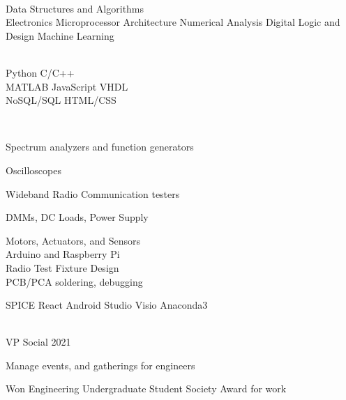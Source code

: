 \documentclass[]{rj-res}
\begin{document}
\begin{minipage}

\begin{multicols}{3}
\begin{multirows}

\location{}
 \\
\location{}
Data Structures and Algorithms \\
Electronics \newline
Microprocessor Architecture \newline
Numerical Analysis \newline
Digital Logic and Design \newline
Machine Learning 
\sectionsep

\\
\textbullet{}
Python \textbullet{}
C/C++ \\ \textbullet{} 
MATLAB \textbullet{}
JavaScript \textbullet{}
VHDL \\ \textbullet{} 
NoSQL/SQL \textbullet{} HTML/CSS

\sectionsep
\end{multirows}
\columnbreak

\location{}
\\
\begin{tightemize}
\item Spectrum analyzers and function generators
\item Oscilloscopes
\item Wideband Radio Communication testers
\item DMMs, DC Loads, Power Supply
\end{tightemize}
Motors, Actuators, and Sensors\\
Arduino and Raspberry Pi \\
Radio Test Fixture Design \\
PCB/PCA soldering, debugging
\sectionsep

\location{}
\location{}
\textbullet{} SPICE \textbullet{}
React \textbullet{} 
Android Studio \textbullet{}
Visio \textbullet{}
Anaconda3 
\sectionsep

\columnbreak
\location{}
\begin{multirows}
\location{}
\\
VP Social 2021
\begin{tightemize}
\item Manage events, and gatherings for engineers
\item Won Engineering Undergraduate Student Society Award for work 
\end{tightemize}


\end{multirows}
\end{multicols}
\end{minipage}
\end{document}
